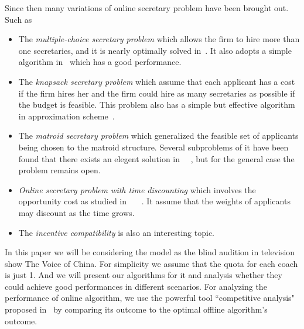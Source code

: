 Since then many variations of online secretary problem have been brought
out. Such as 
\begin{itemize}
	\item The \emph{multiple-choice secretary problem} which allows 
the firm to hire more than one secretaries, and it is nearly optimally 
solved in~\cite{kleinberg2005multiple}. It also adopts a simple algorithm
in~\cite{babaioff2007knapsack} which has a good performance.

	\item The \emph{knapsack secretary problem} which assume that each 
	applicant has a cost if the firm hires her and the firm could
	hire as many secretaries as possible if the budget is feasible. This
	problem also has a simple but effective algorithm in 
	approximation scheme~\cite{babaioff2007knapsack}.

	\item The \emph{matroid secretary problem} which generalized the
	feasible set of applicants being chosen to the matroid structure.
	Several subproblems of it have been found that there exists 
	an elegent solution in
	~\cite{dimitrov2008competitive}~\cite{babaioff2007matroids},
	but for the general case the problem remains open.

	\item \emph{Online secretary problem with time discounting} which
	involves the opportunity cost as studied 
	in~\cite{babaioff2008secretary}~\cite{rasmussen1975choosing}
	~\cite{gershkov2007dynamic}. 
	It assume that the weights of applicants
	may discount as the time grows.

	\item The \emph{incentive compatibility} is also an interesting
	topic.

\end{itemize}

In this paper we will be considering the model as the blind audition
in television show The Voice of China. For simplicity we assume that
the quota for each coach is just 1. And we will present our algorithms
for it and analysis whether they could achieve good performances in
different scenarios.
For analyzing the performance of online algorithm, we use the powerful
tool ``competitive analysis" proposed in~\cite{sleator1985amortized}
by comparing its outcome to the optimal offline algorithm's outcome.

